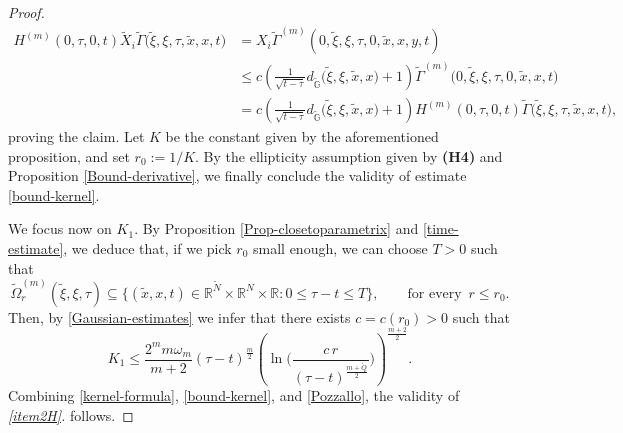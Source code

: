 \documentclass[11pt,a4paper]{article}
\numberwithin{equation}{section}
\newcommand{\R}{\mathbb{R}}
\def \rn {{\mathbb {R}}^{N}}
\def \rnm {{\mathbb {R}}^{\tilde N}}
\def \tt {\tilde}
\def \GG {{\mathbb{G}}}
\def \ti {\times}
\def \G {{\Gamma}}
\def \t {{\tau}}
\def \x {{\xi}}
\begin{document}
{{\begin{proof}
\begin{equation}
\begin{aligned}
			H^{(m)}(0,\t,0,t)\tt X_i\tt\G\big(\tt \x, \x, \t,\tt x, x,t\big)& = X_i\tt\G^{(m)}(0,\tt \x, \x, \t,0,\tt x, x,y,t)\\
			&\leq  c \left(\frac{1}{\sqrt{t-\t}}d_{\tt\GG}\big(\tt \x,  \x,\tt x,x \big) + 1 \right) \tt \G^{(m)}\big(0,\tt \x,\x ,\t,0,\tt x, x ,t\big)\\
			&= c \left(\frac{1}{\sqrt{t-\t}}d_{\tt\GG}\big(\tt \x,  \x,\tt x, x\big) + 1 \right) H^{(m)}(0,\t,0,t)\tt\G\big(\tt \x, \x, \t,\tt x, x,t\big),				
		\end{aligned}
	\end{equation}
	proving the claim. Let $K$ be the constant given by the aforementioned proposition, and set $r_0:=1/K$. By the ellipticity assumption given by \textbf{(H4)} and Proposition \ref{Bound-derivative}, we finally conclude the validity of estimate \eqref{bound-kernel}.
	
	
	We focus now on $K_1$. By Proposition \ref{Prop-closetoparametrix} and \eqref{time-estimate}, we deduce that, if we pick $r_0$ small enough, we can choose $T>0$ such that
	\begin{equation}
		\tt\Omega_{r}^{(m)}(\tt\x,\x,\t)\subseteq \Big\{(\tt x, x, t)\in \rnm\ti\rn\ti\R : 0\leq \t-t\leq T\Big\}, \qquad \text{for every }\,r\leq r_0.
	\end{equation}
	Then, by \eqref{Gaussian-estimates} we infer that there exists $c=c(r_0)>0$ such that
	\begin{equation}\label{Pozzallo}
		K_1\leq \frac{2^m m \omega_m}{m+2}(\t-t)^\frac{m}{2}\left(\ln\Bigg(\frac{c\,r}{(\t-t)^\frac{m+\tt Q}{2}}\Bigg) \right)^\frac{m+2}{2}.
	\end{equation}
	Combining \eqref{kernel-formula}, \eqref{bound-kernel}, and \eqref{Pozzallo}, the validity of \emph{\ref{item2H}.} follows.
	

\end{proof}}}
\end{document}
